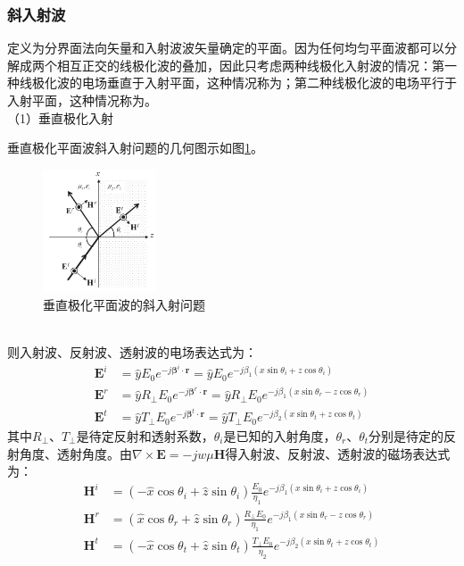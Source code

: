 \documentclass{article}
\numberwithin{equation}{section}
\renewcommand{\vec}[1]{\boldsymbol{#1}}
\begin{document}
\subsubsection{斜入射波}
定义\textbf{\color{blue}{入射平面}}为分界面法向矢量和入射波波矢量确定的平面。因为任何均匀平面波都可以分解成两个相互正交的线极化波的叠加，因此只考虑两种线极化入射波的情况：第一种线极化波的电场垂直于入射平面，这种情况称为\textbf{\color{blue}{垂直极化入射}}；第二种线极化波的电场平行于入射平面，这种情况称为\textbf{\color{blue}{平行极化入射}}。
\\
（1）垂直极化入射\par
垂直极化平面波斜入射问题的几何图示如图\ref{fig:fig44}。
\begin{figure}[ht]
    \centering
    \includegraphics[width=0.3\textwidth]{垂直极化平面波的斜入射问题.PNG}
    \caption{垂直极化平面波的斜入射问题}
    \label{fig:fig44}
\end{figure}
\\
则入射波、反射波、透射波的电场表达式为：
\begin{align}
    \label{eq:eq401}
    \mathbf{E}^i&=\hat{y}E_0e^{-j\vec{\beta}^i\cdot\vec{r}}=\hat{y}E_0e^{-j\beta_1(x\sin\theta_i+z\cos\theta_i)} \\
    \label{eq:eq402}
    \mathbf{E}^r&=\hat{y}R_{\perp}E_0e^{-j\vec{\beta}^r\cdot\vec{r}}=\hat{y}R_{\perp}E_0e^{-j\beta_1(x\sin\theta_r-z\cos\theta_r)} \\
    \label{eq:eq403}
    \mathbf{E}^t&=\hat{y}T_{\perp}E_0e^{-j\vec{\beta}^t\cdot\vec{r}}=\hat{y}T_{\perp}E_0e^{-j\beta_2(x\sin\theta_t+z\cos\theta_t)}
\end{align}
其中$R_{\perp}$、$T_{\perp}$是待定反射和透射系数，$\theta_i$是已知的入射角度，$\theta_r$、$\theta_t$分别是待定的反射角度、透射角度。由$\nabla\times\mathbf{E}=-jw\mu\mathbf{H}$得入射波、反射波、透射波的磁场表达式为：
\begin{align}
    \label{eq:eq404}
    \mathbf{H}^i&=(-\hat{x}\cos\theta_i+\hat{z}\sin\theta_i)\frac{E_0}{\eta_1}e^{-j\beta_1(x\sin\theta_i+z\cos\theta_i)} \\
    \label{eq:eq405}
    \mathbf{H}^r&=(\hat{x}\cos\theta_r+\hat{z}\sin\theta_r)\frac{R_{\perp}E_0}{\eta_1}e^{-j\beta_1(x\sin\theta_r-z\cos\theta_r)} \\
    \label{eq:eq406}
    \mathbf{H}^t&=(-\hat{x}\cos\theta_t+\hat{z}\sin\theta_t)\frac{T_{\perp}E_0}{\eta_2}e^{-j\beta_2(x\sin\theta_t+z\cos\theta_t)}
\end{align}
\end{document}
